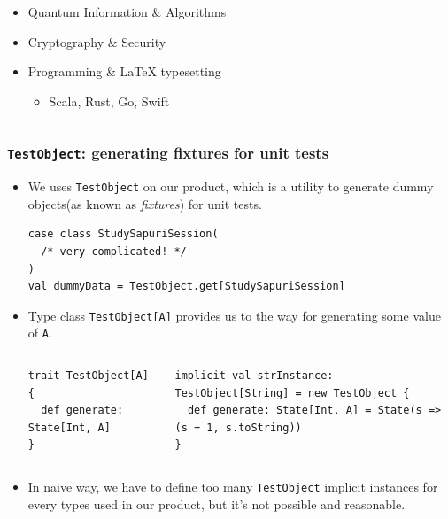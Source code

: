 \begin{frame}
\begin{columns}
\begin{column}{0.7\textwidth}
\begin{itemize}
        \item Quantum Information \& Algorithms

        \item Cryptography \& Security
        
        \item Programming \& {\LaTeX} typesetting
        \begin{itemize}
          \item Scala, Rust, Go, Swift
        \end{itemize}
      \end{itemize}
    \end{column}
  \end{columns}
\end{frame}

\begin{frame}[fragile]
  \frametitle{\lstinline|TestObject|: generating fixtures for unit tests}

  \begin{itemize}
    \item<+-> We uses \lstinline|TestObject| on our product,
    which is a utility to generate dummy objects(as known as \emph{fixtures}) for unit tests.
\begin{lstlisting}[style=scala]
case class StudySapuriSession(
  /* very complicated! */
)
val dummyData = TestObject.get[StudySapuriSession]
\end{lstlisting}

    \item<+-> Type class \lstinline|TestObject[A]| provides us to the way for generating some value of \lstinline|A|.
    \begin{columns}
      \begin{column}{0.32\textwidth}
\begin{lstlisting}[style=scala]
trait TestObject[A] {
  def generate: State[Int, A]
}
\end{lstlisting}
      \end{column}
      \begin{column}{0.68\textwidth}
\begin{lstlisting}[style=scala]
implicit val strInstance: TestObject[String] = new TestObject {
  def generate: State[Int, A] = State(s => (s + 1, s.toString))
}
\end{lstlisting}
      \end{column}
    \end{columns}

    \item<+-> In naive way, we have to define too many \lstinline|TestObject| implicit instances for
    every types used in our product, but it's not possible and reasonable.
  \end{itemize}


\end{frame}
